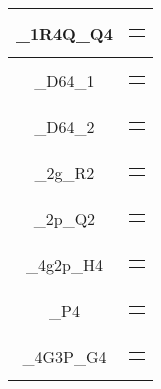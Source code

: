 \begin{table}[H]
\begin{tabularx}{\textwidth}{ | c | X | }
    \_1R4Q\_Q4 &
    \begin{tabular}{@{}c@{}}
        $Q = Q_3 Q_2 Q_1 (Q_0 + R)$
    \end{tabular}\\\hline
    
    \_D64\_1 &
    \begin{tabular}{@{}c@{}}
        $D = g_1 + p_2g_0 + p_2p_1p_0$
    \end{tabular}\\\hline
    
    \_D64\_2 &
    \begin{tabular}{@{}c@{}}
        $D = D (R + Q)$
    \end{tabular}\\\hline
    
    \_2g\_R2 &
    \begin{tabular}{@{}c@{}}
        $R = g_1 + g_0$
    \end{tabular}\\\hline
    
    \_2p\_Q2 &
    \begin{tabular}{@{}c@{}}
        $Q = p_1p_0$
    \end{tabular}\\\hline
    
    \_4g2p\_H4 &
    \begin{tabular}{@{}c@{}}
        $H = g_3 + g_2 + p_1g_1 + p_1p_0g_0$
    \end{tabular}\\\hline
    
    \_P4 &
    \begin{tabular}{@{}c@{}}
        $P = p_3p_2p_1p_0$
    \end{tabular}\\\hline
    
    \_4G3P\_G4 &
    \begin{tabular}{@{}c@{}}
        $G = G_3 + P_2G_2 + P_2P_1G_1 + P_2P_1P_0G_0$
    \end{tabular}\\\hline
    

\end{tabularx}
\end{table}
